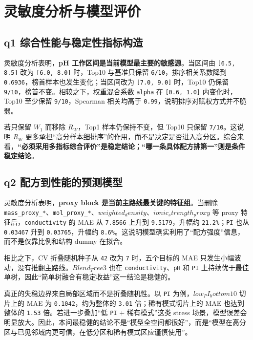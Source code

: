 \documentclass[bwprint]{gmcmthesis}
\numberwithin{figure}{section}
\begin{document}
\section{灵敏度分析与模型评价}

\subsection{q1 综合性能与稳定性指标构造}

灵敏度分析表明，\textbf{pH 工作区间是当前模型最主要的敏感源}。当区间由 \texttt{[6.5, 8.5]} 改为 \texttt{[6.0, 8.0]} 时，Top10 与基准只保留 \texttt{6/10}，排序相关系数降到 \texttt{0.6936}，榜首样本也发生变化；当区间改为 \texttt{[7.0, 9.0]} 时，Top10 仍保留 \texttt{9/10}，榜首不变。相较之下，权重混合系数 \texttt{alpha} 在 \texttt{[0.6, 1.0]} 内变化时，Top10 至少保留 \texttt{9/10}，Spearman 相关均高于 \texttt{0.99}，说明排序对赋权方式并不脆弱。\par

若只保留 $W_1$ 而移除 $R_W$，Top1 样本仍保持不变，但 Top10 只保留 \texttt{7/10}。这说明 $R_W$ 更多承担“高分样本细排序”的作用，而不是决定是否进入高分区。综合来看，\textbf{“必须采用多指标综合评价”是稳定结论；“哪一条具体配方排第一”则是条件稳定结论}。\par

\subsection{q2 配方到性能的预测模型}

灵敏度分析表明，\textbf{proxy block 是当前主路线最关键的特征组}。当删除 \texttt{mass\_proxy\_*}、\texttt{mol\_proxy\_*}、$weighted_density$、$ionic_strength_proxy$ 等 proxy 特征后，\texttt{conductivity} 的 MAE 从 \texttt{7.8566} 上升到 \texttt{9.5179}，升幅约 \texttt{21.2\%}；\texttt{PI} 也从 \texttt{0.03467} 升到 \texttt{0.03765}，升幅约 \texttt{8.6\%}。这说明模型确实利用了“配方强度”信息，而不是仅靠比例和结构 dummy 在拟合。\par

相比之下，CV 折叠随机种子从 \texttt{42} 改为 \texttt{7} 时，五个目标的 MAE 只发生小幅波动，没有推翻主路线。$Blend_Tree3$ 也在 \texttt{conductivity}、\texttt{pH} 和 \texttt{PI} 上持续优于最佳单树，因此“简单树融合有稳定收益”这一结论是稳健的。\par

真正的失稳边界来自局部区域而不是折叠随机性。以 \texttt{PI} 为例，$low_PI_bottom10$ 切片上的 MAE 为 \texttt{0.1042}，约为整体的 \texttt{3.01} 倍；稀有模式切片上的 MAE 也达到整体的 \texttt{1.53} 倍。若进一步叠加“低 \texttt{PI} + 稀有模式”这类 stress 场景，模型误差会明显放大。因此，本问最稳健的结论不是“模型全空间都很好”，而是“模型在高分区与已见邻域内更可信，在低分区和稀有模式区应谨慎使用”。\par
\end{document}
